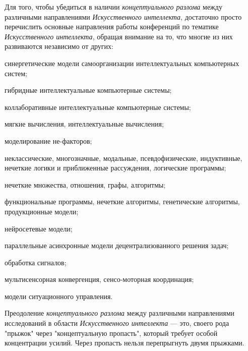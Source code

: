 Для того, чтобы убедиться в наличии \textit{концептуального разлома} между различными направлениями \textit{Искусственного интеллекта}, достаточно просто перечислить основные направления работы конференций по тематике \textit{Искусственного интеллекта}, обращая внимание на то, что многие из них развиваются независимо от других:

\begin{textitemize}
	\item
	синергетические модели самоорганизации интеллектуальных компьютерных систем;
	\item
	гибридные интеллектуальные компьютерные системы;
	\item
	коллаборативные интеллектуальные компьютерные системы;
	\item
	мягкие вычисления, интеллектуальные вычисления;
	\item
	моделирование не-факторов;
	\item
	неклассические, многозначные, модальные, псевдофизические, индуктивные, нечеткие логики и приближенные рассуждения, логические программы;
	\item
	нечеткие множества, отношения, графы, алгоритмы;
	\item
	функциональные программы, нечеткие алгоритмы, генетические алгоритмы, продукционные модели;
	\item
	нейросетевые модели;
	\item
	параллельные асинхронные модели децентрализованного решения задач;
	\item
	обработка сигналов;
	\item
	мультисенсорная конвергенция, сенсо-моторная координация;
	\item
	модели ситуационного управления.
\end{textitemize}

Преодоление \textit{концептуального разлома} между различными направлениями исследований в области \textit{Искусственного интеллекта} --- это, своего рода "прыжок"{} через "концептуальную пропасть"{}, который требует особой концентрации усилий. Через пропасть нельзя перепрыгнуть двумя прыжками.

